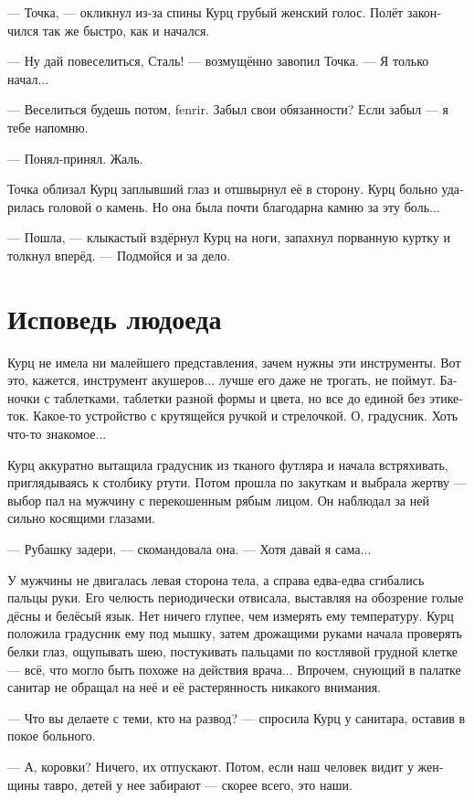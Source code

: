 \documentclass[a4paper,12pt,fleqn]{book}\usepackage{polyglossia}\setdefaultlanguage[babelshorthands=true]{russian}\setotherlanguage{english}\defaultfontfeatures{Ligatures=TeX,Mapping=tex-text}\usepackage{xcolor}\newcommand{\ml}[3]{#2}
\begin{document}
--- Точка, --- окликнул из-за спины Курц грубый женский голос.
Полёт закончился так же быстро, как и начался.

--- Ну дай повеселиться, Сталь! --- возмущённо завопил Точка.
--- Я только начал...

--- Веселиться будешь потом, fenrir.
Забыл свои обязанности?
Если забыл --- я тебе напомню.

--- Понял-принял.
Жаль.

Точка облизал Курц заплывший глаз и отшвырнул её в сторону.
Курц больно ударилась головой о камень.
Но она была почти благодарна камню за эту боль...

--- Пошла, --- клыкастый вздёрнул Курц на ноги, запахнул порванную куртку и толкнул вперёд.
--- Подмойся и за дело.

\section{Исповедь людоеда}

Курц не имела ни малейшего представления, зачем нужны эти инструменты.
Вот это, кажется, инструмент акушеров... лучше его даже не трогать, не поймут.
Баночки с таблетками, таблетки разной формы и цвета, но все до единой без этикеток.
Какое-то устройство с крутящейся ручкой и стрелочкой.
О, градусник.
Хоть что-то знакомое...

Курц аккуратно вытащила градусник из тканого футляра и начала встряхивать, приглядываясь к столбику ртути.
Потом прошла по закуткам и выбрала жертву --- выбор пал на мужчину с перекошенным рябым лицом.
Он наблюдал за ней сильно косящими глазами.

--- Рубашку задери, --- скомандовала она.
--- Хотя давай я сама...

У мужчины не двигалась левая сторона тела, а справа едва-едва сгибались пальцы руки.
Его челюсть периодически отвисала, выставляя на обозрение голые дёсны и белёсый язык.
Нет ничего глупее, чем измерять ему температуру.
Курц положила градусник ему под мышку, затем дрожащими руками начала проверять белки глаз, ощупывать шею, постукивать пальцами по костлявой грудной клетке --- всё, что могло быть похоже на действия врача...
Впрочем, снующий в палатке санитар не обращал на неё и её растерянность никакого внимания.

--- Что вы делаете с теми, кто на развод? --- спросила Курц у санитара, оставив в покое больного.

--- А, коровки?
Ничего, их отпускают.
Потом, если наш человек видит у женщины тавро, детей у нее забирают --- скорее всего, это наши.
\end{document}
